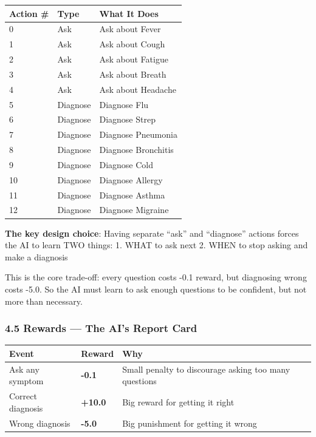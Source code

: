 \documentclass[
]{article}
\begin{document}
\begin{longtable}[]{@{}lll@{}}
\toprule
Action \# & Type & What It Does \\
\midrule
\endhead
0 & Ask & Ask about Fever \\
1 & Ask & Ask about Cough \\
2 & Ask & Ask about Fatigue \\
3 & Ask & Ask about Breath \\
4 & Ask & Ask about Headache \\
5 & Diagnose & Diagnose Flu \\
6 & Diagnose & Diagnose Strep \\
7 & Diagnose & Diagnose Pneumonia \\
8 & Diagnose & Diagnose Bronchitis \\
9 & Diagnose & Diagnose Cold \\
10 & Diagnose & Diagnose Allergy \\
11 & Diagnose & Diagnose Asthma \\
12 & Diagnose & Diagnose Migraine \\
\bottomrule
\end{longtable}

\textbf{The key design choice}: Having separate ``ask'' and ``diagnose''
actions forces the AI to learn TWO things: 1. WHAT to ask next 2. WHEN
to stop asking and make a diagnosis

This is the core trade-off: every question costs -0.1 reward, but
diagnosing wrong costs -5.0. So the AI must learn to ask enough
questions to be confident, but not more than necessary.

\hypertarget{rewards-the-ais-report-card}{%
\subsubsection{4.5 Rewards --- The AI's Report
Card}\label{rewards-the-ais-report-card}}

\begin{longtable}[]{@{}lll@{}}
\toprule
Event & Reward & Why \\
\midrule
\endhead
Ask any symptom & \textbf{-0.1} & Small penalty to discourage asking too
many questions \\
Correct diagnosis & \textbf{+10.0} & Big reward for getting it right \\
Wrong diagnosis & \textbf{-5.0} & Big punishment for getting it wrong \\
\bottomrule
\end{longtable}
\end{document}
